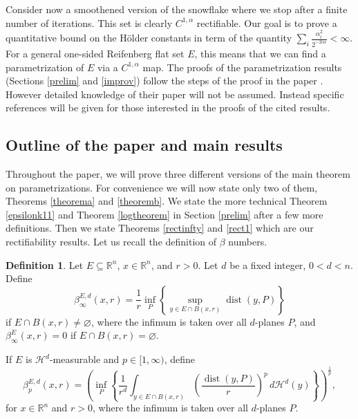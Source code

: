 \documentclass[11pt, twoside, leqno]{article}
\numberwithin{equation}{section}
\theoremstyle{plain}
\theoremstyle{definition}
\newtheorem{defin}[thm]{Definition}
\newcommand{\R}{\mathbb{R}}
\renewcommand{\emptyset}{\varnothing} %
\newcommand{\dist}{\operatorname{dist}}
\begin{document}
Consider now a smoothened version of the snowflake where we stop after a finite number of iterations. This set is clearly $C^{1,\alpha}$ rectifiable. Our goal is to prove a quantitative bound on the H\"older constants in term of the quantity $\sum_i\frac{\alpha_i^2}{2^{-2\alpha i}} < \infty$. For a general one-sided Reifenberg flat set $E$, this means that we can find a parametrization of $E$ via a $C^{1,\alpha}$ map. The proofs of the parametrization results (Sections \ref{prelim} and \ref{improv}) follow the steps of the proof in the paper \cite{davidtoro}.  However detailed knowledge of their paper will not be assumed. Instead specific references will be given for those interested in the proofs of the cited results.

\subsection{Outline of the paper and main results} \label{results}

Throughout the paper, we will prove three different versions of the main theorem on parametrizations. For convenience we will now state only two of them, Theorems \ref{theorema} and \ref{theoremb}. We state the more technical Theorem \ref{epsilonk11} and Theorem \ref{logtheorem} in Section \ref{prelim} after a few more definitions. Then we state Theorems \ref{rectinfty} and \ref{rect1} which are our rectifiability results. 
Let us recall the definition of $\beta$ numbers.
\begin{defin}
Let $E \subseteq \R^n$, $x \in \R^n$, and $r>0$. Let $d$ be a fixed integer, $0 < d < n$. Define
\begin{equation}
\beta_{\infty}^{E,d}(x,r)=\frac{1}{r}\inf_P\left\{\sup_{y \in E \cap B(x,r)} \dist(y,P)\right\}
\end{equation}
if $E \cap B(x,r) \neq \emptyset$, where the infimum is taken over all $d$-planes $P$, and $\beta_{\infty}^E(x,r)=0$ if $E \cap B(x,r) = \emptyset$. 

If $E$ is $\mathcal{H}^d$-measurable and $p \in [1, \infty)$, define
 \begin{equation}
\beta_p^{E,d}(x,r)=\left( \inf_P\left\{\frac{1}{r^d} \int_{y \in E \cap B(x,r)} \left(\frac{\dist(y,P)}{r}\right)^p\,d\mathcal{H}^d(y)\right\} \right)^{\frac{1}{p}},
\end{equation}
for $x \in \R^n$ and $r>0$, where the infimum is taken over all $d$-planes $P$.
\end{defin}
\end{document}

